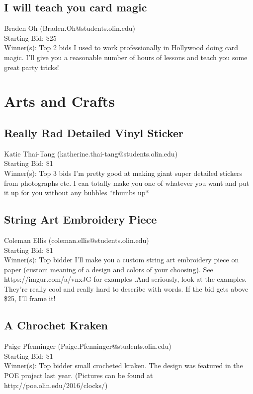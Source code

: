 \documentclass[11pt]{article}
\begin{document}
\subsection{I will teach you card magic}
Braden Oh (Braden.Oh@students.olin.edu) \\
Starting Bid: \$25 \\
Winner(s): 
Top 2 bids\newline
I used to work professionally in Hollywood doing card magic. I'll give you a reasonable number of hours of lessons and teach you some great party tricks!
\section{Arts and Crafts}
\subsection{Really Rad Detailed Vinyl Sticker}
Katie Thai-Tang (katherine.thai-tang@students.olin.edu) \\
Starting Bid: \$1 \\
Winner(s): 
Top 3 bids\newline
I'm pretty good at making giant super detailed stickers from photographs etc. I can totally make you one of whatever you want and put it up for you without any bubbles *thumbs up*
\subsection{String Art Embroidery Piece}
Coleman Ellis (coleman.ellis@students.olin.edu) \\
Starting Bid: \$1 \\
Winner(s): 
Top bidder\newline
I'll make you a custom string art embroidery piece on paper (custom meaning of a design and colors of your choosing). See https://imgur.com/a/vnxJG for examples .And seriously, look at the examples. They're really cool and really hard to describe with words. If the bid gets above \$25, I'll frame it!
\subsection{A Chrochet Kraken}
Paige Pfenninger (Paige.Pfenninger@students.olin.edu) \\
Starting Bid: \$1 \\
Winner(s): 
Top bidder small crocheted kraken. The design was featured in the POE project last year. (Pictures can be found at http://poe.olin.edu/2016/clocks/)
\end{document}

